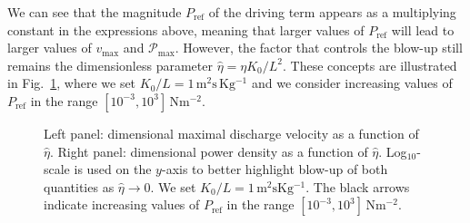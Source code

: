 \documentclass[12pt,a4paper]{amsart}
\theoremstyle{definition}
\newcommand{\heta}{\hat{\eta}}
\newcommand{\unit}[1]{\mathrm{#1}}
\begin{document}
%
We can see that the magnitude $P_{\text{ref}}$ of the driving term appears as a multiplying constant in the expressions above, meaning that larger values of $P_{\text{ref}}$ will lead to larger values of $v_{\max}$ and $\mathcal{P}_{\max }$. However, the factor that controls the blow-up still remains the dimensionless parameter
$\heta = \eta K_0/L^2$.
These concepts are illustrated in Fig.~\ref{fig:dimensional_M_eta_step_pulse},
where we set $K_0/L = 1 \,\unit{m^2 s \,Kg^{-1}}$ and we consider increasing values of $P_{\text{ref}}$
in the range $[10^{-3}, 10^3] \, \unit{N m^{-2}}$.
\begin{figure}[h!]
\begin{center}
\caption{Left panel: dimensional maximal discharge velocity as a function of $\heta$.
Right panel: dimensional power density as a function of $\heta$. Log$_{10}$-scale is used on the $y$-axis to
better highlight blow-up of both quantities as $\hat{\eta} \rightarrow 0$. We set $K_0/L = 1 \,
\unit{m^2 s Kg^{-1}}$. The black arrows indicate increasing values of $P_{\text{ref}}$
in the range $[10^{-3}, 10^3] \, \unit{N m^{-2}}$.}
\label{fig:dimensional_M_eta_step_pulse}
\end{center}
\end{figure}
\end{document}
